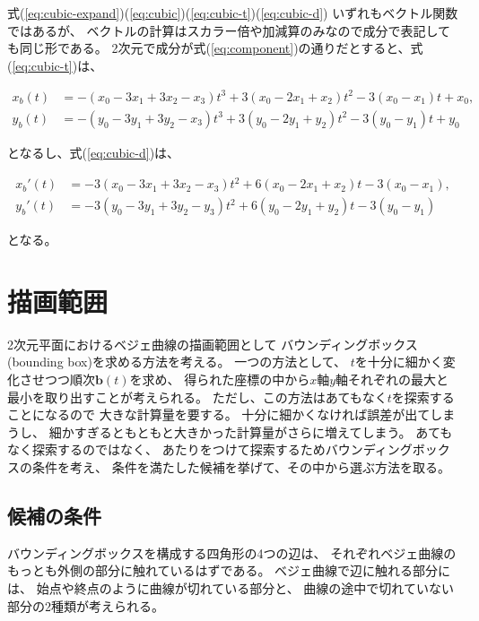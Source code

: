 \documentclass[dvipdfmx]{jsarticle}
\newcommand\VectBold[1]{\boldsymbol{#1}}
\newcommand\VectBold[1]{\symbf{#1}}
\newcommand\Vect[1]{\VectBold{#1}}
\begin{document}
式(\ref{eq:cubic-expand})(\ref{eq:cubic})(\ref{eq:cubic-t})(\ref{eq:cubic-d})%
いずれもベクトル関数ではあるが、
ベクトルの計算はスカラー倍や加減算のみなので成分で表記しても同じ形である。
2次元で成分が式(\ref{eq:component})の通りだとすると、式(\ref{eq:cubic-t})は、

\begin{align}
  x_b\left(t\right)
  &=
  - \left( x_0-3x_1+3x_2-x_3 \right)t^3
  + 3\left( x_0-2x_1+x_2 \right)t^2
  - 3\left( x_0-x_1 \right)t
  + x_0,
  \label{eq:xb}
  \\
  y_b\left(t\right)
  &=
  - \left( y_0-3y_1+3y_2-x_3 \right)t^3
  + 3\left( y_0-2y_1+y_2 \right)t^2
  - 3\left( y_0-y_1 \right)t
  + y_0
  \label{eq:yb}
\end{align}

となるし、式(\ref{eq:cubic-d})は、

\begin{align}
  x_b{}'\left(t\right)
  &=
  -3\left( x_0 -3x_1 +3x_2 -x_3 \right) t^2
  +6\left( x_0 -2x_1 + x_2 \right) t
  -3\left( x_0 - x_1 \right),
  \label{eq:xb-d}
  \\
  y_b{}'\left(t\right)
  &=
  -3\left( y_0 -3y_1 +3y_2 -y_3 \right) t^2
  +6\left( y_0 -2y_1 + y_2 \right) t
  -3\left( y_0 - y_1 \right)
  \label{eq:yb-d}
\end{align}

となる。

\section{描画範囲}

2次元平面におけるベジェ曲線の描画範囲として
バウンディングボックス(bounding box)を求める方法を考える。
一つの方法として、
$t$を十分に細かく変化させつつ順次$\Vect{b}\left(t\right)$を求め、
得られた座標の中から$x$軸$y$軸それぞれの最大と最小を取り出すことが考えられる。
ただし、この方法はあてもなく$t$を探索することになるので
大きな計算量を要する。
十分に細かくなければ誤差が出てしまうし、
細かすぎるともともと大きかった計算量がさらに増えてしまう。
あてもなく探索するのではなく、
あたりをつけて探索するためバウンディングボックスの条件を考え、
条件を満たした候補を挙げて、その中から選ぶ方法を取る。

\subsection{候補の条件}

バウンディングボックスを構成する四角形の4つの辺は、
それぞれベジェ曲線のもっとも外側の部分に触れているはずである。
ベジェ曲線で辺に触れる部分には、
始点や終点のように曲線が切れている部分と、
曲線の途中で切れていない部分の2種類が考えられる。
\end{document}
